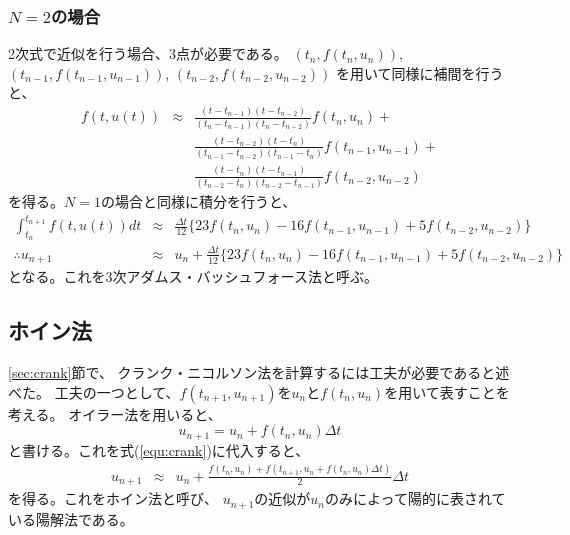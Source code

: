 \documentclass[a4j, titlepage]{jsarticle}
\numberwithin{equation}{section}
\begin{document}
        \subsubsection{$N=2$の場合}
            2次式で近似を行う場合、3点が必要である。
            $(t_n, f(t_n, u_n))$,
            $(t_{n-1}, f(t_{n-1}, u_{n-1}))$,
            $(t_{n-2}, f(t_{n-2}, u_{n-2}))$
            を用いて同様に補間を行うと、
            \begin{eqnarray*}
                f(t, u(t)) &\approx& \frac{(t - t_{n-1})(t - t_{n-2})}{(t_n - t_{n-1})(t_n - t_{n-2})}f(t_n, u_n) + \\
                && \frac{(t - t_{n-2})(t - t_n)}{(t_{n-1} - t_{n-2})(t_{n-1} - t_n)}f(t_{n-1}, u_{n-1}) + \\
                && \frac{(t - t_n)(t - t_{n-1})}{(t_{n-2} - t_n)(t_{n-2} - t_{n-1})}f(t_{n-2}, u_{n-2})
            \end{eqnarray*}
            を得る。$N=1$の場合と同様に積分を行うと、
            \begin{eqnarray}
                \int^{t_{n+1}}_{t_n} f(t, u(t)) dt &\approx& \frac{\Delta t}{12} \{23f(t_n, u_n) - 16f(t_{n-1}, u_{n-1}) + 5f(t_{n-2}, u_{n-2})\} \nonumber \\
                \therefore u_{n+1} &\approx& u_n + \frac{\Delta t}{12} \{23f(t_n, u_n) - 16f(t_{n-1}, u_{n-1}) + 5f(t_{n-2}, u_{n-2})\}
            \end{eqnarray}
            となる\cite{text}。これを3次アダムス・バッシュフォース法と呼ぶ。

    \subsection{ホイン法}
        \ref{sec:crank}節で、
        クランク・ニコルソン法を計算するには工夫が必要であると述べた。
        工夫の一つとして、$f(t_{n+1},u_{n+1})$を$u_n$と$f(t_n, u_n)$を用いて表すことを考える。
        オイラー法を用いると、
        \begin{equation*}
            u_{n+1} = u_n + f(t_n, u_n)\Delta t
        \end{equation*}
        と書ける。これを式(\ref{equ:crank})に代入すると、
        \begin{eqnarray}
            u_{n+1} &\approx& u_n + \frac{f(t_n, u_n) + f(t_{n+1}, u_n + f(t_n, u_n)\Delta t)}{2}\Delta t \label{equ:heun}
        \end{eqnarray}
        を得る。これをホイン法と呼び、
        $u_{n+1}$の近似が$u_n$のみによって陽的に表されている陽解法である。
\end{document}
